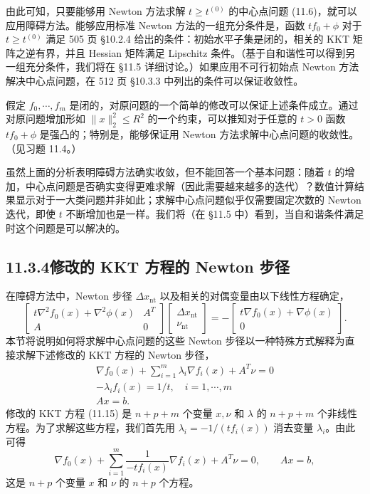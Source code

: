 \documentclass[UTF8,12pt,a4paper,fontset=fandol]{ctexart}
\begin{document}
由此可知，只要能够用 Newton 方法求解 $t\geq t^{(0)}$ 的中心点问题 (11.6)，就可以应用障碍方法。能够应用标准 Newton 方法的一组充分条件是，函数 $tf_0+\phi$ 对于 $t\geq t^{(0)}$ 满足 505 页 \S10.2.4 给出的条件：初始水平子集是闭的，相关的 KKT 矩阵之逆有界，并且 Hessian 矩阵满足 Lipschitz 条件。（基于自和谐性可以得到另一组充分条件，我们将在 \S11.5 详细讨论。）如果应用不可行初始点 Newton 方法解决中心点问题，在 512 页 \S10.3.3 中列出的条件可以保证收敛性。

假定 $f_0,\cdots,f_m$ 是闭的，对原问题的一个简单的修改可以保证上述条件成立。通过对原问题增加形如 $\|x\|_2^2\leq R^2$ 的一个约束，可以推知对于任意的 $t>0$ 函数 $tf_0+\phi$ 是强凸的；特别是，能够保证用 Newton 方法求解中心点问题的收敛性。（见习题 11.4。）

虽然上面的分析表明障碍方法确实收敛，但不能回答一个基本问题：随着 $t$ 的增加，中心点问题是否确实变得更难求解（因此需要越来越多的迭代）？数值计算结果显示对于一大类问题并非如此；求解中心点问题似乎仅需要固定次数的 Newton 迭代，即使 $t$ 不断增加也是一样。我们将（在 \S11.5 中）看到，当自和谐条件满足时这个问题是可以解决的。

\subsection*{11.3.4\quad 修改的 KKT 方程的 Newton 步径}

在障碍方法中，Newton 步径 $\Delta x_{\mathrm{nt}}$ 以及相关的对偶变量由以下线性方程确定，
\begin{equation}
\begin{bmatrix}
t\nabla^2 f_0(x)+\nabla^2\phi(x) & A^T\\
A & 0
\end{bmatrix}
\begin{bmatrix}
\Delta x_{\mathrm{nt}}\\
\nu_{\mathrm{nt}}
\end{bmatrix}
=-
\begin{bmatrix}
t\nabla f_0(x)+\nabla\phi(x)\\
0
\end{bmatrix}.
\tag{11.14}
\end{equation}
本节将说明如何将求解中心点问题的这些 Newton 步径以一种特殊方式解释为直接求解下述修改的 KKT 方程的 Newton 步径，
\begin{equation}
\begin{gathered}
\nabla f_0(x)+\sum_{i=1}^m \lambda_i\nabla f_i(x)+A^T\nu=0\\
-\lambda_i f_i(x)=1/t,\quad i=1,\cdots,m\\
Ax=b.
\end{gathered}
\tag{11.15}
\end{equation}
修改的 KKT 方程 (11.15) 是 $n+p+m$ 个变量 $x,\nu$ 和 $\lambda$ 的 $n+p+m$ 个非线性方程。为了求解这些方程，我们首先用 $\lambda_i=-1/(tf_i(x))$ 消去变量 $\lambda_i$。由此可得
\begin{equation}
\nabla f_0(x)+\sum_{i=1}^m\frac{1}{-tf_i(x)}\nabla f_i(x)+A^T\nu=0,\qquad Ax=b,
\tag{11.16}
\end{equation}
这是 $n+p$ 个变量 $x$ 和 $\nu$ 的 $n+p$ 个方程。
\end{document}
